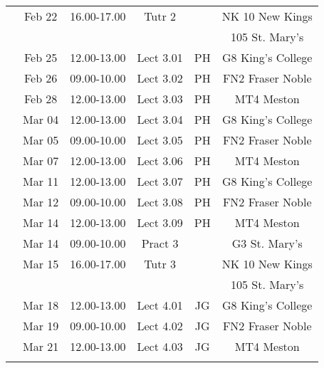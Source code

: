 \documentclass[11pt,oneside,a4paper]{article}
\begin{document}
\begin{center}
\begin{tabular}{||c||c|c|c|c|c||}
                                      & Feb 22   & 16.00-17.00 & Tutr  2     &     & NK 10 New Kings \\
                                      &          &             &             &     & 105 St. Mary's \\
\hline
\multirow{3}{*}{\color{red}{Week 34}} & Feb 25   & 12.00-13.00 & Lect  3.01  & PH  & G8 King's College \\
                                      & Feb 26   & 09.00-10.00 & Lect  3.02  & PH  & FN2 Fraser Noble \\
                                      & Feb 28   & 12.00-13.00 & Lect  3.03  & PH  & MT4 Meston    \\
\hline
\multirow{3}{*}{\color{red}{Week 35}} & Mar 04   & 12.00-13.00 & Lect  3.04  & PH  & G8 King's College \\
                                      & Mar 05   & 09.00-10.00 & Lect  3.05  & PH  & FN2 Fraser Noble \\
                                      & Mar 07   & 12.00-13.00 & Lect  3.06  & PH  & MT4 Meston    \\
\hline
\multirow{3}{*}{\color{red}{Week 36}} & Mar 11   & 12.00-13.00 & Lect  3.07  & PH  & G8 King's College \\
                                      & Mar 12   & 09.00-10.00 & Lect  3.08  & PH  & FN2 Fraser Noble \\
                                      & Mar 14   & 12.00-13.00 & Lect  3.09  & PH  & MT4 Meston    \\
                                      & Mar 14   & 09.00-10.00 & Pract 3     &     & G3 St. Mary's \\
                                      & Mar 15   & 16.00-17.00 & Tutr  3     &     & NK 10 New Kings \\
                                      &          &             &             &     & 105 St. Mary's \\
\hline
\multirow{3}{*}{\color{red}{Week 37}} & Mar 18   & 12.00-13.00 & Lect  4.01  & JG  & G8 King's College \\
                                      & Mar 19   & 09.00-10.00 & Lect  4.02  & JG  & FN2 Fraser Noble \\
                                      & Mar 21   & 12.00-13.00 & Lect  4.03  & JG  & MT4 Meston    \\
\hline\hline
                                      &          &             &             &     &               \\

\end{tabular}
\end{center}
\end{document}
